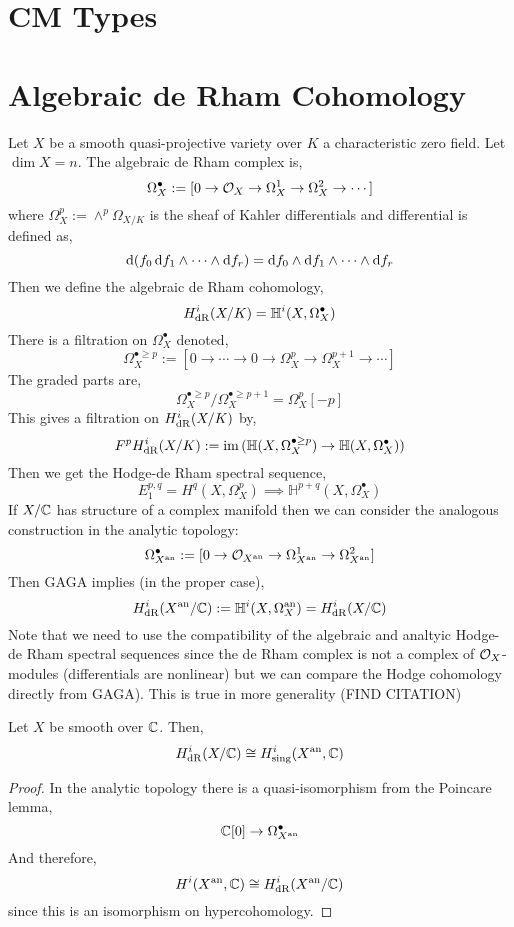 \documentclass[12pt]{article}
\begin{document}
\section{CM Types}

\section{Algebraic de Rham Cohomology}

\newcommand{\HH}{\mathbb{H}}
\newcommand{\cH}{\mathcal{cH}}

Let $X$ be a smooth quasi-projective variety over $K$ a characteristic zero field. Let $\dim{X} = n$. The algebraic de Rham complex is,
\[ \Omega^\bullet_X := [0 \to \mathcal{O}_{X} \to \Omega^1_X \to \Omega^2_X \to \cdots] \]
where $\Omega^p_X := \wedge^p \Omega_{X/K}$ is the sheaf of Kahler differentials and differential is defined as,
\[ \mathrm{d}{(f_0 \, \mathrm{d}{f_1} \wedge \cdots \wedge \mathrm{d}{f_r})} = \mathrm{d}{f_0} \wedge \mathrm{d}{f_1} \wedge \cdots \wedge \mathrm{d}{f_r} \]
Then we define the algebraic de Rham cohomology,
\[ H^i_{\dR}(X/K) = \HH^i(X, \Omega^\bullet_X) \]
There is a filtration on $\Omega_X^{\bullet}$ denoted,
\[ \Omega_X^{\bullet \ge p} := [ 0 \to \cdots \to 0 \to \Omega^p_{X} \to \Omega^{p+1}_X \to \cdots ] \]
The graded parts are,
\[ \Omega_X^{\bullet \ge p} / \Omega_X^{\bullet \ge p + 1} = \Omega_X^p[-p] \]
This gives a filtration on $H_{\mathrm{dR}}^i(X/K)$ by,
\[ F^p H_{\dR}^i(X/K) := \im{(\HH(X, \Omega_X^{\bullet \ge p}) \to \HH(X, \Omega_X^\bullet))} \]
Then we get the Hodge-de Rham spectral sequence,
\[ E^{p,q}_1 = H^q(X, \Omega^p_X) \implies \HH^{p+q}(X, \Omega_X^\bullet) \]
If $X / \mathbb{C}$ has structure of a complex manifold then we can consider the analogous construction in the analytic topology:
\[ \Omega_{X^{\mathrm{an}}}^\bullet := [ 0 \to \mathcal{O}_{X^{\mathrm{an}}} \to \Omega^1_{X^{\mathrm{an}}} \to \Omega^2_{X^{\mathrm{an}}}] \]
Then GAGA implies (in the proper case),
\[ H^i_{\dR}(X^\an/\CC) := \HH^i(X, \Omega^{\an}_X) = H^i_{\dR}(X/\CC) \]
Note that we need to use the compatibility of the algebraic and analtyic Hodge-de Rham spectral sequences since the de Rham complex is not a complex of $\mathcal{O}_{X}$-modules (differentials are nonlinear) but we can compare the Hodge cohomology directly from GAGA).
This is true in more generality (FIND CITATION)

\begin{prop}[Grothendieck]
Let $X$ be smooth over $\mathbb{C}$. Then,
\[ H_{\mathrm{dR}}^i(X/\mathbb{C}) \cong H^i_{\text{sing}}(X^{\mathrm{an}}, \mathbb{C}) \]
\end{prop}

\begin{proof}
In the analytic topology there is a quasi-isomorphism from the Poincare lemma,
\[ \mathbb{C}[0] \to \Omega_{X^{\mathrm{an}}}^\bullet \]
And therefore,
\[ H^i(X^{\mathrm{an}}, \mathbb{C}) \cong H_{\mathrm{dR}}^i(X^{\mathrm{an}}/\mathbb{C}) \]
since this is an isomorphism on hypercohomology.
\end{proof}
\end{document}
